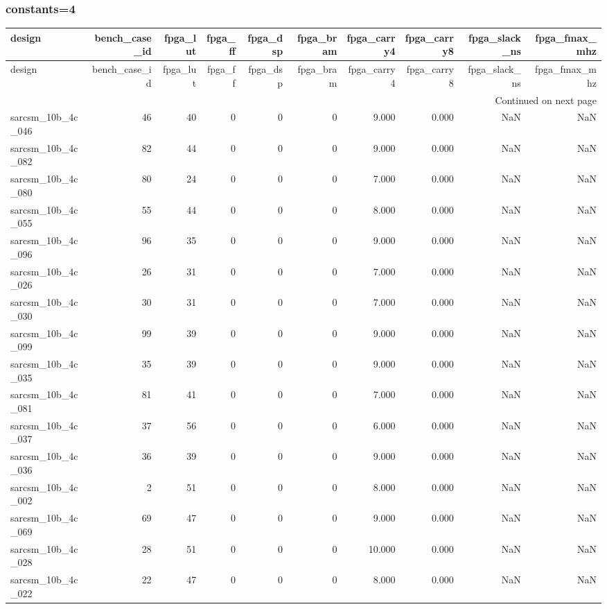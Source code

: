 \documentclass{article}
\begin{document}
\subsubsection*{constants=4}
\begin{longtable}{lrrrrrrrrr}
\toprule
design & bench\_case\_id & fpga\_lut & fpga\_ff & fpga\_dsp & fpga\_bram & fpga\_carry4 & fpga\_carry8 & fpga\_slack\_ns & fpga\_fmax\_mhz \\
\midrule
\endfirsthead
\toprule
design & bench\_case\_id & fpga\_lut & fpga\_ff & fpga\_dsp & fpga\_bram & fpga\_carry4 & fpga\_carry8 & fpga\_slack\_ns & fpga\_fmax\_mhz \\
\midrule
\endhead
\midrule
\multicolumn{10}{r}{Continued on next page} \\
\midrule
\endfoot
\bottomrule
\endlastfoot
sarcsm\_10b\_4c\_046 & 46 & 40 & 0 & 0 & 0 & 9.000 & 0.000 & NaN & NaN \\
sarcsm\_10b\_4c\_082 & 82 & 44 & 0 & 0 & 0 & 9.000 & 0.000 & NaN & NaN \\
sarcsm\_10b\_4c\_080 & 80 & 24 & 0 & 0 & 0 & 7.000 & 0.000 & NaN & NaN \\
sarcsm\_10b\_4c\_055 & 55 & 44 & 0 & 0 & 0 & 8.000 & 0.000 & NaN & NaN \\
sarcsm\_10b\_4c\_096 & 96 & 35 & 0 & 0 & 0 & 9.000 & 0.000 & NaN & NaN \\
sarcsm\_10b\_4c\_026 & 26 & 31 & 0 & 0 & 0 & 7.000 & 0.000 & NaN & NaN \\
sarcsm\_10b\_4c\_030 & 30 & 31 & 0 & 0 & 0 & 7.000 & 0.000 & NaN & NaN \\
sarcsm\_10b\_4c\_099 & 99 & 39 & 0 & 0 & 0 & 9.000 & 0.000 & NaN & NaN \\
sarcsm\_10b\_4c\_035 & 35 & 39 & 0 & 0 & 0 & 9.000 & 0.000 & NaN & NaN \\
sarcsm\_10b\_4c\_081 & 81 & 41 & 0 & 0 & 0 & 7.000 & 0.000 & NaN & NaN \\
sarcsm\_10b\_4c\_037 & 37 & 56 & 0 & 0 & 0 & 6.000 & 0.000 & NaN & NaN \\
sarcsm\_10b\_4c\_036 & 36 & 39 & 0 & 0 & 0 & 9.000 & 0.000 & NaN & NaN \\
sarcsm\_10b\_4c\_002 & 2 & 51 & 0 & 0 & 0 & 8.000 & 0.000 & NaN & NaN \\
sarcsm\_10b\_4c\_069 & 69 & 47 & 0 & 0 & 0 & 9.000 & 0.000 & NaN & NaN \\
sarcsm\_10b\_4c\_028 & 28 & 51 & 0 & 0 & 0 & 10.000 & 0.000 & NaN & NaN \\
sarcsm\_10b\_4c\_022 & 22 & 47 & 0 & 0 & 0 & 8.000 & 0.000 & NaN & NaN \\

\end{longtable}
\end{document}
